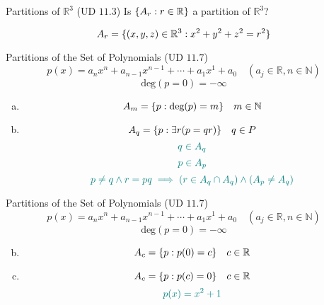 \begin{frame}{}
  \begin{exampleblock}{Partitions of $\mathbb{R}^{3}$ (UD $11.3$)}
    Is $\{A_r: r \in \mathbb{R}\}$ a partition of $\mathbb{R}^{3}$?

    \[
      A_{r} = \{(x,y,z) \in \mathbb{R}^{3}: x^2 + y^2 + z^2 = r^2\}
    \]
  \end{exampleblock}

  \pause
\end{frame}

\begin{frame}{}
  \begin{exampleblock}{Partitions of the Set of Polynomials (UD $11.7$)}
    \[
      p(x) = a_n x^n + a_{n-1} x^{n-1} + \cdots + a_1 x^1 + a_0 \quad (a_j \in \mathbb{R}, n \in \mathbb{N})
    \]
    \[
      \text{deg}(p = 0) = -\infty
    \]

    \begin{enumerate}[(a)]
      \item
	\[
	  A_m = \{p: \text{deg}(p) = m\} \quad m \in \mathbb{N}
	\]
      \setcounter{enumi}{2}
      \item 
	\[
	  A_q = \{p: \exists r (p = qr)\} \quad q \in P
	\]
	\pause
	\vspace{-0.20cm}
	\[
	  \textcolor{teal}{q \in A_q}
	\]
	\vspace{-0.30cm}
	\[
	  \textcolor{teal}{p \in A_p}
	\]
	\pause
	\vspace{-0.30cm}
	\[
	  \textcolor{teal}{p \neq q \land r = pq \implies (r \in A_q \cap A_q) \land (A_p \neq A_q)}
	\]
    \end{enumerate}
  \end{exampleblock}
\end{frame}

\begin{frame}{}
  \begin{exampleblock}{Partitions of the Set of Polynomials (UD $11.7$)}
    \[
      p(x) = a_n x^n + a_{n-1} x^{n-1} + \cdots + a_1 x^1 + a_0 \quad (a_j \in \mathbb{R}, n \in \mathbb{N})
    \]
    \[
      \text{deg}(p = 0) = -\infty
    \]

    \begin{enumerate}[(a)]
      \setcounter{enumi}{1}
      \item 
	\[
	  A_c = \{p: p(0) = c\} \quad c \in \mathbb{R}
	\]
      \setcounter{enumi}{3}
      \item 
	\[
	  A_c = \{p: p(c) = 0\} \quad c \in \mathbb{R}
	\]
	\pause
	\vspace{-0.20cm}
	\[
	  \textcolor{teal}{p(x) = x^2 + 1}
	\]
    \end{enumerate}
  \end{exampleblock}
\end{frame}

